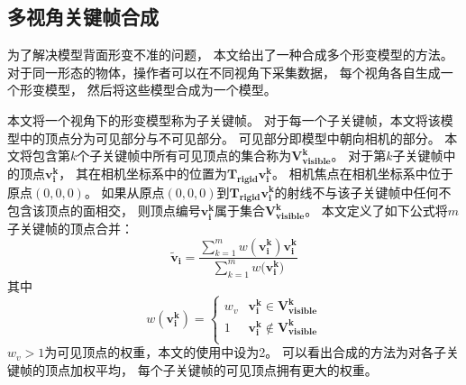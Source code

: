 \subsection{多视角关键帧合成}
为了解决模型背面形变不准的问题，
本文给出了一种合成多个形变模型的方法。
对于同一形态的物体，操作者可以在不同视角下采集数据，
每个视角各自生成一个形变模型，
然后将这些模型合成为一个模型。

本文将一个视角下的形变模型称为子关键帧。
对于每一个子关键帧，本文将该模型中的顶点分为可见部分与不可见部分。
可见部分即模型中朝向相机的部分。
本文将包含第$k$个子关键帧中所有可见顶点的集合称为$\bm{V_{visible}^k}$。
对于第$k$子关键帧中的顶点$\bm{v_i^k}$，
其在相机坐标系中的位置为$\bm{T_{rigid}}\bm{v_i^k}$。
相机焦点在相机坐标系中位于原点$(0,0,0)$。
如果从原点$(0,0,0)$到$\bm{T_{rigid}}\bm{v_i^k}$的射线不与该子关键帧中任何不包含该顶点的面相交，
则顶点编号$\bm{v_i^k}$属于集合$\bm{V_{visible}^k}$。
本文定义了如下公式将$m$子关键帧的顶点合并：
\begin{equation}
    \widetilde{\bm{v}}_{\bm{i}} =
        \frac
            {\sum_{k=1}^{m} w(\bm{v_i^k})\bm{v_i^k}}
            {\sum_{k=1}^{m}w(\bm{v_i^k)}}
\end{equation}
其中
\begin{equation}
    w(\bm{v_i^k})=
    \begin{cases}
        w_v
        &\bm{v_i^k} \in \bm{V_{visible}^k}\\
        1
        &\bm{v_i^k} \notin \bm{V_{visible}^k}\\
    \end{cases}
\end{equation}
$w_v>1$为可见顶点的权重，本文的使用中设为2。
可以看出合成的方法为对各子关键帧的顶点加权平均，
每个子关键帧的可见顶点拥有更大的权重。
       
